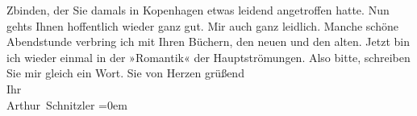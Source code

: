 \begin{ledgroupsized}[t]{13cm}
                  Zbinden, der Sie damals in Kopenhagen etwas leidend angetroffen hatte. Nun
               gehts Ihnen hoffentlich wieder ganz gut. Mir auch ganz leidlich. Manche  schöne Abendstunde verbring ich mit Ihren Büchern,
               den neuen und den alten. Jetzt bin ich wieder einmal in der »Romantik« der Hauptströmungen.\pend
           \pstart
           Also bitte, schreiben Sie mir gleich ein Wort.\pend
           \pstart
           Sie von Herzen grüßend{\\[\baselineskip]}Ihr{\\[\baselineskip]}\spacefill\mbox{Arthur Schnitzler}\pend
           \leftskip=0em{}
         
         \endnumbering{}\end{ledgroupsized}  \newcommand{\dateiname}{L02432}\newcommand{\titel}{Arthur Schnitzler an Georg Brandes, 11. 2. 1925}\newcommand{\editorInnen}{Martin Anton Müller und Gerd-Hermann Susen}
      